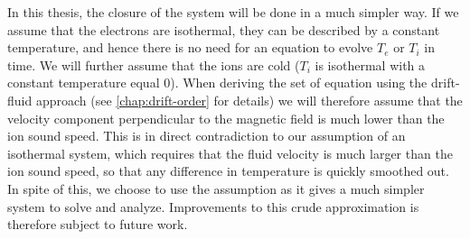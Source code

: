 In this thesis, the closure of the system will be done in a much simpler way.
If we assume that the electrons are isothermal, they can be described by a constant temperature, and hence there is no need for an equation to evolve $T_e$ or $T_i$ in time.
We will further assume that the ions are cold ($T_i$ is isothermal with a constant temperature equal $0$).
When deriving the set of equation using the drift-fluid approach (see \cref{chap:drift-order} for details) we will therefore assume that the velocity component perpendicular to the magnetic field is much lower than the ion sound speed.
This is in direct contradiction to our assumption of an isothermal system, which requires that the fluid velocity is much larger than the ion sound speed, so that any difference in temperature is quickly smoothed out.
In spite of this, we choose to use the assumption as it gives a much simpler system to solve and analyze.
Improvements to this crude approximation is therefore subject to future work.
